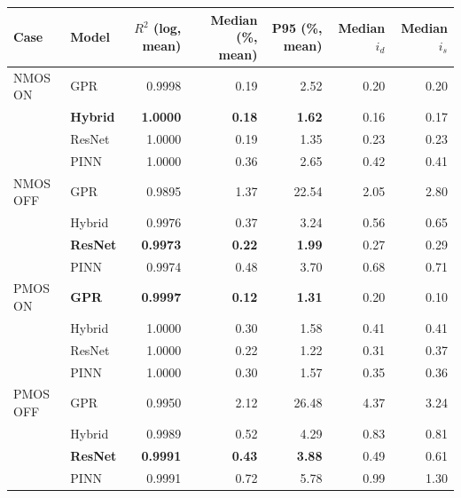 \begin{tabular}{llrrrrr}
\toprule
Case & Model & $R^2$ (log, mean) & Median (\%, mean) & P95 (\%, mean) & Median $i_d$ & Median $i_s$ \\
\midrule
NMOS ON & GPR & 0.9998 & 0.19 & 2.52 & 0.20 & 0.20 \\
 & \textbf{Hybrid} & \textbf{1.0000} & \textbf{0.18} & \textbf{1.62} & 0.16 & 0.17 \\
 & ResNet & 1.0000 & 0.19 & 1.35 & 0.23 & 0.23 \\
 & PINN & 1.0000 & 0.36 & 2.65 & 0.42 & 0.41 \\
\midrule
NMOS OFF & GPR & 0.9895 & 1.37 & 22.54 & 2.05 & 2.80 \\
 & Hybrid & 0.9976 & 0.37 & 3.24 & 0.56 & 0.65 \\
 & \textbf{ResNet} & \textbf{0.9973} & \textbf{0.22} & \textbf{1.99} & 0.27 & 0.29 \\
 & PINN & 0.9974 & 0.48 & 3.70 & 0.68 & 0.71 \\
\midrule
PMOS ON & \textbf{GPR} & \textbf{0.9997} & \textbf{0.12} & \textbf{1.31} & 0.20 & 0.10 \\
 & Hybrid & 1.0000 & 0.30 & 1.58 & 0.41 & 0.41 \\
 & ResNet & 1.0000 & 0.22 & 1.22 & 0.31 & 0.37 \\
 & PINN & 1.0000 & 0.30 & 1.57 & 0.35 & 0.36 \\
\midrule
PMOS OFF & GPR & 0.9950 & 2.12 & 26.48 & 4.37 & 3.24 \\
 & Hybrid & 0.9989 & 0.52 & 4.29 & 0.83 & 0.81 \\
 & \textbf{ResNet} & \textbf{0.9991} & \textbf{0.43} & \textbf{3.88} & 0.49 & 0.61 \\
 & PINN & 0.9991 & 0.72 & 5.78 & 0.99 & 1.30 \\
\bottomrule
\end{tabular}
